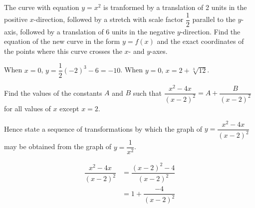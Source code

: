 \documentclass{jhwhw}
\begin{document}

    \problem{}
        The curve with equation $y=x^2$ is tranformed by a translation of 2 units in the positive $x$-direction, followed by a stretch with scale factor $\dfrac12$ parallel to the $y$-axis, followed by a translation of 6 units in the negative $y$-direction. Find the equation of the new curve in the form $y = f(x)$ and the exact coordinates of the points where this curve crosses the $x$- and $y$-axes.

    \solution       
        \begin{center}
        \end{center}


        When $x=0$, $y = \dfrac12 (-2)^3 - 6 = -10$. When $y = 0$, $x = 2 + \sqrt[3]{12}$.


    \problem{}
        Find the values of the constants $A$ and $B$ such that $\dfrac{x^2-4x}{(x-2)^2} = A + \dfrac{B}{(x-2)^2}$ for all values of $x$ except $x=2$.

        Hence state a sequence of transformations by which the graph of $y = \dfrac{x^2-4x}{(x-2)^2}$ may be obtained from the graph of $y = \dfrac1{x^2}$.

    \solution
        \begin{align*}
            \dfrac{x^2-4x}{(x-2)^2} &= \dfrac{(x-2)^2 - 4}{(x-2)^2} \\ 
            &= 1 + \dfrac{- 4}{(x-2)^2} \\ 
        \end{align*}

\end{document}
